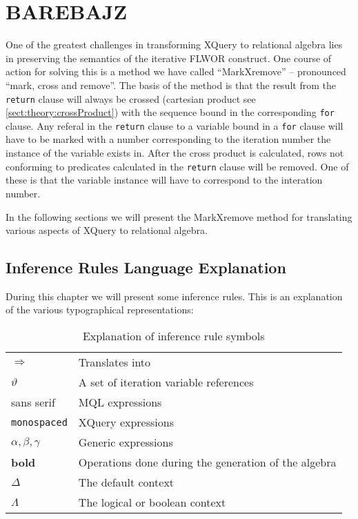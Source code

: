 \newpage
\section{BAREBAJZ}
\label{sect:translation:mXr}

One of the greatest challenges in transforming XQuery to relational algebra lies in preserving the semantics of
the iterative FLWOR construct. One course of action for solving this is a method we have called ``MarkXremove'' --
pronounced ``mark, cross and remove''. The basis of the method is that the result from the \texttt{return} clause
will always be crossed (cartesian product see \ref{sect:theory:crossProduct}) with the sequence bound in the
corresponding \texttt{for} clause. Any referal in the \texttt{return} clause to a variable bound in a \texttt{for}
clause will have to be marked with a number corresponding to the iteration number the instance of the variable
exists in. After the cross product is calculated, rows not conforming to predicates calculated in the
\texttt{return} clause will be removed. One of these is that the variable instance will have to correspond to the
interation number.

In the following sections we will present the MarkXremove method for translating various aspects of XQuery to
relational algebra.

\subsection{Inference Rules Language Explanation}
\label{sect:translation:inferenceExplanation}
During this chapter we will present some inference rules. This is an explanation
of the various typographical representations:

\begin{table}[h]


\begin{tabular}{l|l}

  $\Longrightarrow$  & Translates into \\
  $\vartheta$ & A set of iteration variable references \\
  \textsf{sans serif} & MQL expressions \\
  \texttt{monospaced} & XQuery expressions \\
  $\alpha , \beta, \gamma$ & Generic expressions \\
  \textbf{bold} & Operations done during the generation of the algebra \\
  $\Delta$ & The default context \\
  $\Lambda$ & The logical or boolean context \\
  
\end{tabular}
\caption{Explanation of inference rule symbols}
\label{tab:translation:inferenceRuleSymbols}
\end{table}

